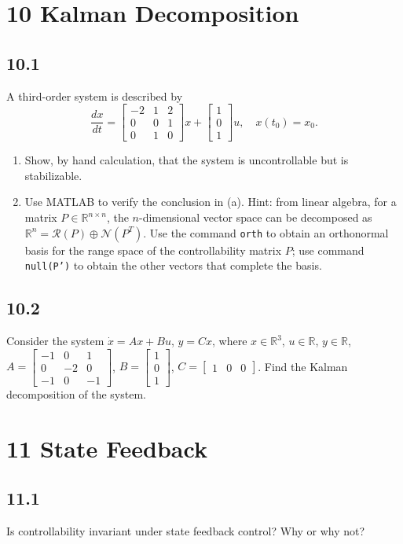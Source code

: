 \documentclass{article}
\newcommand{\problem}[2]{\subsection*{#1}}
\begin{document}
\section*{10 Kalman Decomposition}

\problem{10.1}{}
A third-order system is described by
\[
\frac{dx}{dt} = \begin{bmatrix} -2 & 1 & 2 \\ 0 & 0 & 1 \\ 0 & 1 & 0 \end{bmatrix} x + \begin{bmatrix} 1 \\ 0 \\ 1 \end{bmatrix} u, \quad x(t_0) = x_0.
\]
\begin{enumerate}
\item Show, by hand calculation, that the system is uncontrollable but is stabilizable.
\item Use MATLAB to verify the conclusion in (a). Hint: from linear algebra, for a matrix $P \in \mathbb{R}^{n \times n}$, the $n$-dimensional vector space can be decomposed as $\mathbb{R}^n = \mathcal{R}(P) \oplus \mathcal{N}(P^T)$. Use the command \texttt{orth} to obtain an orthonormal basis for the range space of the controllability matrix $P$; use command \texttt{null(P')} to obtain the other vectors that complete the basis.
\end{enumerate}

\problem{10.2}{}
Consider the system $\dot{x} = Ax + Bu$, $y = Cx$, where $x \in \mathbb{R}^3$, $u \in \mathbb{R}$, $y \in \mathbb{R}$, $A = \begin{bmatrix} -1 & 0 & 1 \\ 0 & -2 & 0 \\ -1 & 0 & -1 \end{bmatrix}$, $B = \begin{bmatrix} 1 \\ 0 \\ 1 \end{bmatrix}$, $C = \begin{bmatrix} 1 & 0 & 0 \end{bmatrix}$. Find the Kalman decomposition of the system.

\section*{11 State Feedback}

\problem{11.1}{state-feedback-concepts}
Is controllability invariant under state feedback control? Why or why not?
\end{document}
